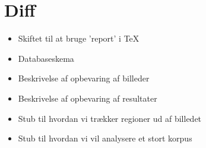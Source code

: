 {
\section*{Diff}
\begin{itemize}
    \item Skiftet til at bruge 'report' i \TeX{}
    \item Databaseskema
    \item Beskrivelse af opbevaring af billeder
    \item Beskrivelse af opbevaring af resultater
    \item Stub til hvordan vi trækker regioner ud af billedet
    \item Stub til hvordan vi vil analysere et stort korpus
\end{itemize}

}

